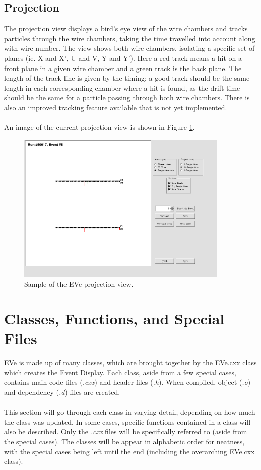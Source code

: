 \documentclass[12pt]{article}
\numberwithin{equation}{section}
\begin{document}
\subsection{Projection} 
The projection view displays a bird's eye view of the wire chambers and tracks particles through the wire chambers, taking the time travelled into account along with wire number. The view shows both wire chambers, isolating a specific set of planes (ie. X and X', U and V, Y and Y'). Here a red track means a hit on a front plane in a given wire chamber and a green track is the back plane. The length of the track line is given by the timing; a good track should be the same length in each corresponding chamber where a hit is found, as the drift time should be the same for a particle passing through both wire chambers. There is also an improved tracking feature available that is not yet implemented.
\\
\\
An image of the current projection view is shown in Figure \ref{fig:proj}.
\begin{figure}[h!]
	\caption{Sample of the EVe projection view.} \label{fig:proj}
	\centering
	\includegraphics[width=0.9\textwidth]{ProjView.png} 
\end{figure} 

\section{Classes, Functions, and Special Files}
EVe is made up of many classes, which are brought together by the EVe.cxx class which creates the Event Display. Each class, aside from a few special cases, contains main code files (\textit{.cxx}) and header files (\textit{.h}). When compiled, object (\textit{.o}) and dependency (\textit{.d}) files are created.
\\
\\
This section will go through each class in varying detail, depending on how much the class was updated. In some cases, specific functions contained in a class will also be described. Only the \textit{.cxx} files will be specifically referred to (aside from the special cases). The classes will be appear in alphabetic order for neatness, with the special cases being left until the end (including the overarching EVe.cxx class).
\end{document}
